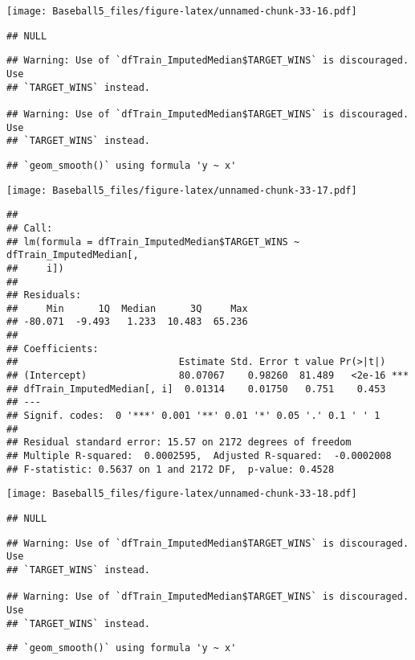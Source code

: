 \documentclass[
]{article}
\begin{document}
\texttt{[image: Baseball5\_files/figure-latex/unnamed-chunk-33-16.pdf]}

\begin{verbatim}
## NULL
\end{verbatim}

\begin{verbatim}
## Warning: Use of `dfTrain_ImputedMedian$TARGET_WINS` is discouraged. Use
## `TARGET_WINS` instead.

## Warning: Use of `dfTrain_ImputedMedian$TARGET_WINS` is discouraged. Use
## `TARGET_WINS` instead.
\end{verbatim}

\begin{verbatim}
## `geom_smooth()` using formula 'y ~ x'
\end{verbatim}

\texttt{[image: Baseball5\_files/figure-latex/unnamed-chunk-33-17.pdf]}

\begin{verbatim}
## 
## Call:
## lm(formula = dfTrain_ImputedMedian$TARGET_WINS ~ dfTrain_ImputedMedian[, 
##     i])
## 
## Residuals:
##     Min      1Q  Median      3Q     Max 
## -80.071  -9.493   1.233  10.483  65.236 
## 
## Coefficients:
##                            Estimate Std. Error t value Pr(>|t|)    
## (Intercept)                80.07067    0.98260  81.489   <2e-16 ***
## dfTrain_ImputedMedian[, i]  0.01314    0.01750   0.751    0.453    
## ---
## Signif. codes:  0 '***' 0.001 '**' 0.01 '*' 0.05 '.' 0.1 ' ' 1
## 
## Residual standard error: 15.57 on 2172 degrees of freedom
## Multiple R-squared:  0.0002595,  Adjusted R-squared:  -0.0002008 
## F-statistic: 0.5637 on 1 and 2172 DF,  p-value: 0.4528
\end{verbatim}

\texttt{[image: Baseball5\_files/figure-latex/unnamed-chunk-33-18.pdf]}

\begin{verbatim}
## NULL
\end{verbatim}

\begin{verbatim}
## Warning: Use of `dfTrain_ImputedMedian$TARGET_WINS` is discouraged. Use
## `TARGET_WINS` instead.

## Warning: Use of `dfTrain_ImputedMedian$TARGET_WINS` is discouraged. Use
## `TARGET_WINS` instead.
\end{verbatim}

\begin{verbatim}
## `geom_smooth()` using formula 'y ~ x'
\end{verbatim}
\end{document}
